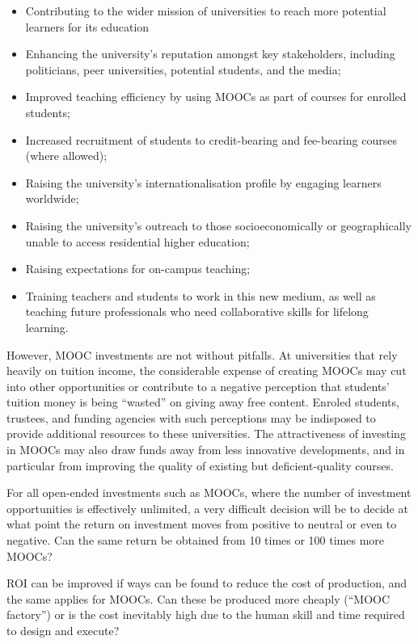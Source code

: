 \begin{itemize}

\item Contributing to the wider mission of universities to reach more
potential learners for its education
\item Enhancing the university's reputation amongst key stakeholders, including politicians, peer
  universities, potential students, and the media;
\item Improved teaching efficiency by using MOOCs as part of courses for enrolled students;
\item Increased recruitment of students to credit-bearing and fee-bearing courses (where allowed);
\item Raising the university's internationalisation profile by engaging learners worldwide;
\item Raising the university's outreach to those socioeconomically or geographically unable to
  access residential higher education;
\item Raising expectations for on-campus teaching;
\item Training teachers and students to work in this new medium, as well as teaching future
  professionals who need collaborative skills for lifelong learning.

\end{itemize}

However, MOOC investments are not without pitfalls.
At universities that rely heavily on tuition income, the considerable
expense of creating MOOCs may cut into other opportunities or
contribute to a negative perception that students' tuition money is
being ``wasted'' on giving away free content.
Enroled students, trustees, and funding agencies with such perceptions
may be indisposed to provide additional resources to these universities.
The attractiveness of investing in MOOCs may also draw funds away from less
innovative developments, and in particular from improving the quality of
existing but deficient-quality courses.
 
For all open-ended investments such as MOOCs, where the number of
investment opportunities is effectively unlimited, a very difficult
decision will be to decide at what point the return on investment moves
from positive to neutral or even to negative.  Can the same return be
obtained from 10 times or 100 times more MOOCs?
 
ROI can be improved if ways can be found to reduce the cost of
production, and the same applies for MOOCs.  Can these be produced more
cheaply (``MOOC factory'') or is the cost inevitably high due to the human
skill and time required to design and execute?



